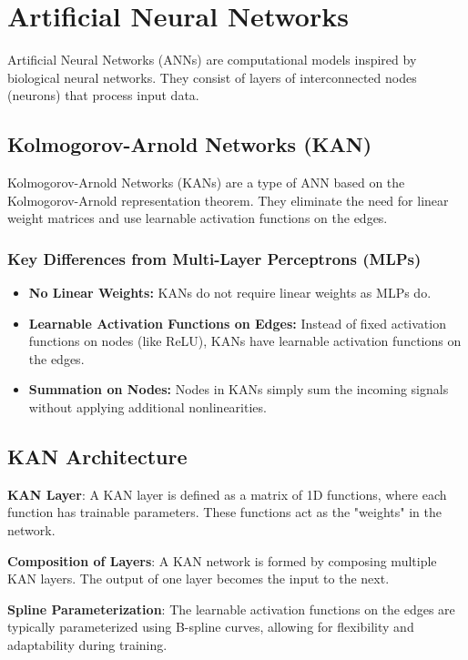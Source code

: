\documentclass{article}
\begin{document}
\section{Artificial Neural Networks}
Artificial Neural Networks (ANNs) are computational models inspired by biological neural networks. They consist of layers of interconnected nodes (neurons) that process input data.

\subsection{Kolmogorov-Arnold Networks (KAN)}
Kolmogorov-Arnold Networks (KANs) are a type of ANN based on the Kolmogorov-Arnold representation theorem. They eliminate the need for linear weight matrices and use learnable activation functions on the edges.

\subsubsection{Key Differences from Multi-Layer Perceptrons (MLPs)}
\begin{itemize}
    \item \textbf{No Linear Weights:} KANs do not require linear weights as MLPs do.
    \item \textbf{Learnable Activation Functions on Edges:} Instead of fixed activation functions on nodes (like ReLU), KANs have learnable activation functions on the edges.
    \item \textbf{Summation on Nodes:} Nodes in KANs simply sum the incoming signals without applying additional nonlinearities.
\end{itemize}

\subsection{KAN Architecture}

\textbf{KAN Layer}: A KAN layer is defined as a matrix of 1D functions, where each function has trainable parameters. These functions act as the "weights" in the network.

\textbf{Composition of Layers}: A KAN network is formed by composing multiple KAN layers. The output of one layer becomes the input to the next.

\textbf{Spline Parameterization}: The learnable activation functions on the edges are typically parameterized using B-spline curves, allowing for flexibility and adaptability during training.
\end{document}
